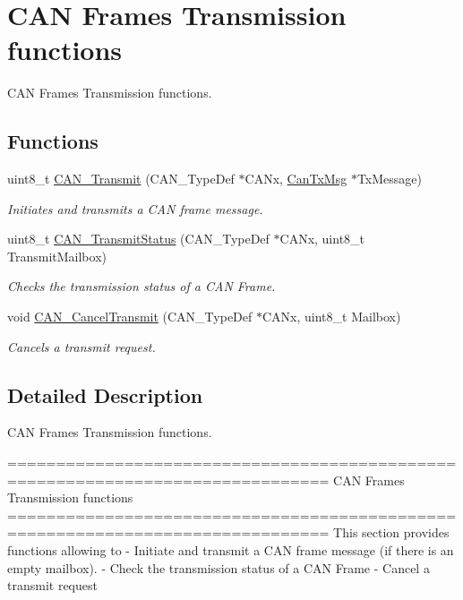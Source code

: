 \hypertarget{group___c_a_n___group2}{\section{C\-A\-N Frames Transmission functions}
\label{group___c_a_n___group2}
}


C\-A\-N Frames Transmission functions.  


\subsection*{Functions}
\begin{DoxyCompactItemize}
\item 
uint8\-\_\-t \hyperlink{group___c_a_n___group2_gaccfcb81f76f58400077c7b2d8641dd83}{C\-A\-N\-\_\-\-Transmit} (C\-A\-N\-\_\-\-Type\-Def $\ast$C\-A\-Nx, \hyperlink{struct_can_tx_msg}{Can\-Tx\-Msg} $\ast$Tx\-Message)
\begin{DoxyCompactList}\small\item\em Initiates and transmits a C\-A\-N frame message. \end{DoxyCompactList}\item 
uint8\-\_\-t \hyperlink{group___c_a_n___group2_ga68ab05a0a6cdfcc2b6f6b6b2c10848e2}{C\-A\-N\-\_\-\-Transmit\-Status} (C\-A\-N\-\_\-\-Type\-Def $\ast$C\-A\-Nx, uint8\-\_\-t Transmit\-Mailbox)
\begin{DoxyCompactList}\small\item\em Checks the transmission status of a C\-A\-N Frame. \end{DoxyCompactList}\item 
void \hyperlink{group___c_a_n___group2_ga81106cdf5395a1947bfc87ec1685829e}{C\-A\-N\-\_\-\-Cancel\-Transmit} (C\-A\-N\-\_\-\-Type\-Def $\ast$C\-A\-Nx, uint8\-\_\-t Mailbox)
\begin{DoxyCompactList}\small\item\em Cancels a transmit request. \end{DoxyCompactList}\end{DoxyCompactItemize}


\subsection{Detailed Description}
C\-A\-N Frames Transmission functions. \begin{DoxyVerb} ===============================================================================
                      CAN Frames Transmission functions
 ===============================================================================  
  This section provides functions allowing to 
   - Initiate and transmit a CAN frame message (if there is an empty mailbox).
   - Check the transmission status of a CAN Frame
   - Cancel a transmit request\end{DoxyVerb}
 

